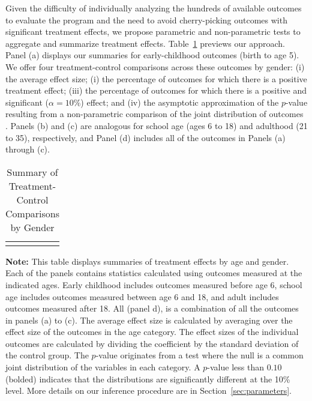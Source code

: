 Given the difficulty of individually analyzing the hundreds of available outcomes to evaluate the program and the need to avoid cherry-picking outcomes with significant treatment effects, we propose parametric and non-parametric tests to aggregate and summarize treatment effects. Table~\ref{table:summary} previews our approach. Panel (a) displays our summaries for early-childhood outcomes (birth to age 5). We offer four treatment-control comparisons across these outcomes by gender: (i) the average effect size; (i) the percentage of outcomes for which there is a positive treatment effect; (iii) the percentage of outcomes for which there is a positive and significant ($\alpha=10\%$) effect; and (iv) the asymptotic approximation of the $p$-value resulting from a non-parametric comparison of the joint distribution of outcomes \citep{Rosenbaum_2005_Distribution_JRSS}. Panels (b) and (c) are analogous for school age (ages 6 to 18) and adulthood (21 to 35), respectively, and Panel (d) includes all of the outcomes in Panels (a) through (c).


\begin{table}[!htpb]
\begin{threeparttable}
\caption{Summary of Treatment-Control Comparisons by Gender} \label{table:summary}
\centering 
\begin{tabularx}{16.5cm}{XcX}
&  & 
\end{tabularx}
\begin{tablenotes}
\footnotesize
\item \textbf{Note:} This table displays summaries of treatment effects by age and gender. Each of the panels contains statistics calculated using outcomes measured at the indicated ages. Early childhood includes outcomes measured before age 6, school age includes outcomes measured between age 6 and 18, and adult includes outcomes measured after 18. All (panel d), is a combination of all the outcomes in panels (a) to (c). The average effect size is calculated by averaging over the effect size of the outcomes in the age category. The effect sizes of the individual outcomes are calculated by dividing the coefficient by the standard deviation of the control group. The \citet{Rosenbaum_2005_Distribution_JRSS} $p$-value originates from a test where the null is a common joint distribution of the variables in each category. A $p$-value less than $0.10$ (bolded) indicates that the distributions are significantly different at the 10\% level. More details on our inference procedure are in Section~\ref{sec:parameters}.
\end{tablenotes}
\end{threeparttable}
\end{table}

